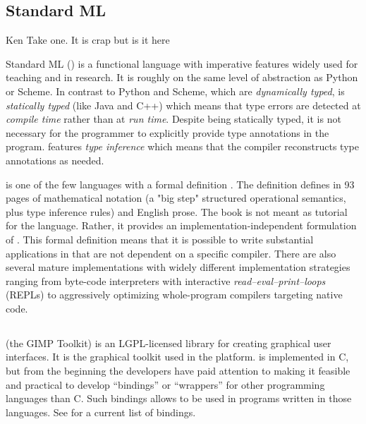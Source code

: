\documentclass[workingdraft]{usetex-v1}
\begin{document}
\subsection{Standard ML}

\begin{ednote}{Ken}
  Take one.  It is crap but is it here
\end{ednote}

Standard ML (\sml) is a functional language with imperative features
widely used for teaching and in research.  It is roughly on the same
level of abstraction as Python or Scheme. In contrast to Python and
Scheme, which are \emph{dynamically typed}, \sml is \emph{statically
  typed} (like Java and C++) which means that type errors are detected
at \emph{compile time} rather than at \emph{run time}.  Despite \sml
being statically typed, it is not necessary for the programmer to
explicitly provide type annotations in the program. \sml features
\emph{type inference} which means that the compiler reconstructs type
annotations as needed.

\sml is one of the few languages with a formal definition
\cite{Milner:1997:Definition}.  The definition defines \sml in 93
pages of mathematical notation (a "big step" structured operational
semantics, plus type inference rules) and English prose.  The book is
not meant as tutorial for the language. Rather, it provides an
implementation-independent formulation of \sml.  This formal
definition means that it is possible to write substantial applications
in \sml that are not dependent on a specific compiler.  There are also
several mature \sml implementations with widely different
implementation strategies ranging from byte-code interpreters with
interactive \emph{read--eval--print--loops} (REPLs) to aggressively
optimizing whole-program compilers targeting native code.




\subsection{\gtk}
\label{sec:gtk}

\gtk (the GIMP Toolkit) \cite{Gtk-webpage:2004} is an LGPL-licensed
\cite{LGPL:1999} library for creating graphical user interfaces. It is
the graphical toolkit used in the \gnome platform.  \gtk is
implemented in C, but from the beginning the \gtk developers have paid
attention to making it feasible and practical to develop ``bindings''
or ``wrappers'' for other programming languages than C. Such bindings
allows \gtk to be used in programs written in those languages. See
\cite{Gtk-bindings-webpage:2004} for a current list of bindings.
\end{document}
